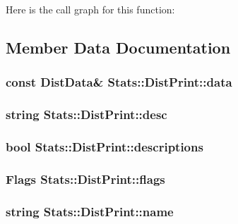 Here is the call graph for this function:




\subsection{Member Data Documentation}
\hypertarget{structStats_1_1DistPrint_a5a1a2f61a36cddf75ea5b9de60c02aa1}{
\subsubsection[{data}]{\setlength{\rightskip}{0pt plus 5cm}const DistData\& {\bf Stats::DistPrint::data}}}
\label{structStats_1_1DistPrint_a5a1a2f61a36cddf75ea5b9de60c02aa1}
\hypertarget{structStats_1_1DistPrint_a20c3c6840bcaefcbd8a9ecbc468421da}{
\subsubsection[{desc}]{\setlength{\rightskip}{0pt plus 5cm}string {\bf Stats::DistPrint::desc}}}
\label{structStats_1_1DistPrint_a20c3c6840bcaefcbd8a9ecbc468421da}
\hypertarget{structStats_1_1DistPrint_a9b91df398053c0c61986dafcc2576c01}{
\subsubsection[{descriptions}]{\setlength{\rightskip}{0pt plus 5cm}bool {\bf Stats::DistPrint::descriptions}}}
\label{structStats_1_1DistPrint_a9b91df398053c0c61986dafcc2576c01}
\hypertarget{structStats_1_1DistPrint_a29f5554b5ad6a9b573fa8e0c4286a128}{
\subsubsection[{flags}]{\setlength{\rightskip}{0pt plus 5cm}Flags {\bf Stats::DistPrint::flags}}}
\label{structStats_1_1DistPrint_a29f5554b5ad6a9b573fa8e0c4286a128}
\hypertarget{structStats_1_1DistPrint_a8effa42b5694542dac7f6fb7f1df4230}{
\subsubsection[{name}]{\setlength{\rightskip}{0pt plus 5cm}string {\bf Stats::DistPrint::name}}}
